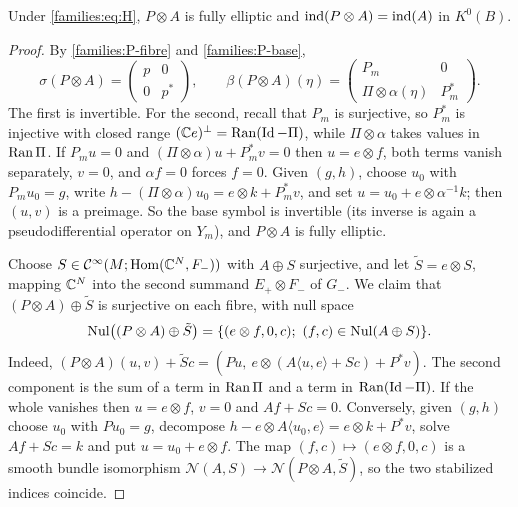 \begin{proposition}\label{families:prop:PA}
  Under \eqref{families:eq:H}, $P\otimes A$ is fully elliptic and
  $\operatorname{ind}(P\otimes A)=\operatorname{ind}(A)$ in $K^0(B)$.
\end{proposition}
\begin{proof}
  By \ref{families:P-fibre} and \ref{families:P-base},
  \begin{equation*}
    \sigma(P\otimes A)=\begin{pmatrix}p&0\\0&p^*\end{pmatrix},\qquad
    \beta(P\otimes A)(\eta)=\begin{pmatrix}P_m&0\\
    \Pi\otimes\alpha(\eta)&P_m^*\end{pmatrix}.
  \end{equation*}
  The first is invertible. For the second, recall that $P_m$ is surjective, so
  $P_m^*$ is injective with closed range $(\mathbb{C} e)^\perp=\operatorname{Ran}(\operatorname{Id}-\Pi)$, while
  $\Pi\otimes\alpha$ takes values in $\operatorname{Ran}\Pi$. If
  $P_mu=0$ and $(\Pi\otimes\alpha)u+P_m^*v=0$ then $u=e\otimes f$, both terms
  vanish separately, $v=0$, and $\alpha f=0$ forces $f=0$. Given $(g,h)$,
  choose $u_0$ with $P_mu_0=g$, write $h-(\Pi\otimes\alpha)u_0=e\otimes k+P_m^*v$,
  and set $u=u_0+e\otimes\alpha^{-1}k$; then $(u,v)$ is a preimage. So the base
  symbol is invertible (its inverse is again a pseudodifferential operator on
  $Y_m$), and $P\otimes A$ is fully elliptic.

  Choose $S\in\mathcal{C}^\infty(M;\operatorname{Hom}(\mathbb{C}^N,F_-))$ with $A\oplus S$ surjective, and let
  $\tilde S=e\otimes S$, mapping $\mathbb{C}^N$ into the second summand $E_+\otimes
  F_-$ of $G_-$. We claim that $(P\otimes A)\oplus\tilde S$ is surjective on
  each fibre, with null space
  \begin{equation}\label{families:eq:null-PA}
    \operatorname{Nul}\bigl((P\otimes A)\oplus\tilde S\bigr)=\{(e\otimes f,0,c);\
    (f,c)\in\operatorname{Nul}(A\oplus S)\}.
  \end{equation}
  Indeed, $(P\otimes A)(u,v)+\tilde Sc=(Pu,\ e\otimes(A\langle u,e\rangle+Sc)
  +P^*v)$. The second component is the sum of a term in $\operatorname{Ran}\Pi$ and a term
  in $\operatorname{Ran}(\operatorname{Id}-\Pi)$. If the whole vanishes then $u=e\otimes f$, $v=0$ and
  $Af+Sc=0$. Conversely, given $(g,h)$ choose $u_0$ with $Pu_0=g$, decompose
  $h-e\otimes A\langle u_0,e\rangle=e\otimes k+P^*v$, solve $Af+Sc=k$ and put
  $u=u_0+e\otimes f$. The map $(f,c)\mapsto(e\otimes f,0,c)$ is a smooth bundle
  isomorphism $\mathcal N(A,S)\to\mathcal N(P\otimes A,\tilde S)$, so the two
  stabilized indices coincide.
\end{proof}

